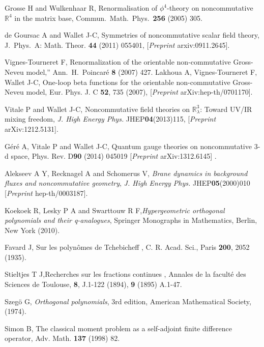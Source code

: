 \documentclass[a4paper,11pt,twoside]{article}
\numberwithin{equation}{section}
\theoremstyle{nonumberplain}
\begin{document}
\begin{thebibliography}{50}
Grosse H and Wulkenhaar R, {{Renormalisation of $\phi^4$-theory on noncommutative $\mathbb{R}^4$ in the matrix base}}, 
Commun.\ Math.\ Phys.\  {\bf 256} (2005) 305.

 de Goursac A and Wallet J-C, {{Symmetries of noncommutative scalar field theory}}, J.\ Phys.\ A: Math. Theor. {\bf{44}} (2011) 055401, [{\it{Preprint }} arxiv:0911.2645]. 

Vignes-Tourneret F, {{Renormalization of the orientable non-commutative Gross-Neveu model}},''  Ann.\ H.\ Poincar\'e {\bf{8}} (2007) 427. Lakhoua A, Vignes-Tourneret F, Wallet J-C, {{One-loop beta functions for the orientable non-commutative Gross-Neveu
 model}}, Eur. Phys. J. C {\bf{52}}, 735 (2007), [{\it{Preprint }} arXiv:hep-th/0701170].

 Vitale P and Wallet J-C, {{Noncommutative field theories on $\mathbb{R}^3_\lambda$: Toward UV/IR mixing freedom}}, {\it{J. High Energy Phys.}} JHEP{\bf{04}}(2013)115, [{\it{Preprint }} arXiv:1212.5131].

 G\'er\'e A, Vitale P and Wallet J-C, {{Quantum gauge theories on noncommutative 3-d space}}, Phys. Rev. D{\bf{90}} (2014) 045019 [{\it{Preprint }} arXiv:1312.6145] .

 Alekseev A Y, Recknagel A and Schomerus V, {\it{Brane dynamics in background fluxes and noncommutative geometry}}, {\it{J. High Energy Phys.}} JHEP{\bf{05}}(2000)010 [{\it{Preprint }} hep-th/0003187].

 Koekoek R, Lesky P A and Swarttouw R F,{\it{Hypergeometric orthogonal polynomials and their q-analogues}}, Springer Monographs in Mathematics, Berlin, New York (2010).

 Favard J, {Sur les polyn\^omes de Tchebicheff }, C. R. Acad. Sci., Paris {\bf{200}}, 2052 (1935).

 Stieltjes T J,{{Recherches sur les fractions continues }}, Annales de la facult\'e des Sciences de Toulouse, {\bf{8}}, J.1-122 (1894), {\bf{9}} (1895) A.1-47.

 Szeg\"o G, {\it{Orthogonal polynomials}}, 3rd edition, American Mathematical Society, (1974).

 Simon B, {{The classical moment problem as a self-adjoint finite difference operator}}, Adv. Math. {\bf{137}} (1998) 82.


\end{thebibliography}
\end{document}
